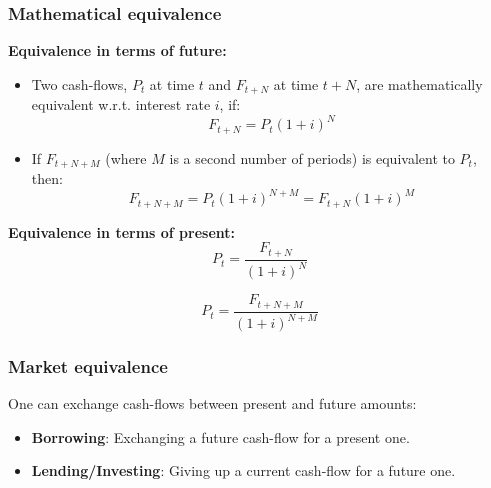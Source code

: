     \subsubsection{Mathematical equivalence}
    \begin{definition}

        \textbf{Equivalence in terms of future:}
        \begin{itemize}
            \item Two cash-flows, \( P_t \) at time \( t \) and \( F_{t+N} \) at time \( t+N \), are mathematically equivalent w.r.t. interest rate \( i \), if:
            \begin{equation}
            F_{t+N} = P_t(1 + i)^N 
            \end{equation}
        
            \item If \( F_{t+N+M} \) (where \( M \) is a second number of periods) is equivalent to \( P_t \), then:
            \begin{equation}
            F_{t+N+M} = P_t(1 + i)^{N+M} = F_{t+N}(1 + i)^M 
            \end{equation}
        \end{itemize} 
        
        \textbf{Equivalence in terms of present:}
        \begin{equation}
        P_t = \frac{F_{t+N}}{(1 + i)^N}
        \end{equation}
        
        \begin{equation}
        P_t = \frac{F_{t+N+M}}{(1 + i)^{N+M}}
        \end{equation}

    \end{definition}

    \subsubsection{Market equivalence}
    \begin{definition}
        One can exchange cash-flows between present and future amounts:
        \begin{itemize}
            \item \textbf{Borrowing}: Exchanging a future cash-flow for a present one.
            \item \textbf{Lending/Investing}: Giving up a current cash-flow for a future one.
        \end{itemize}
        
    \end{definition}

